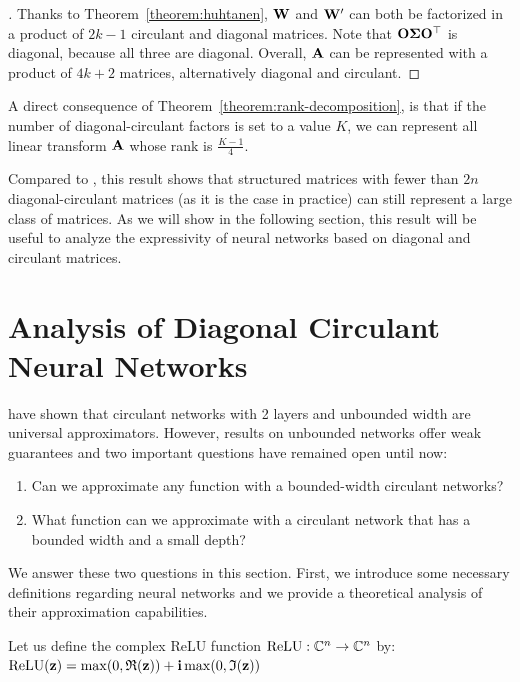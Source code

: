 \begin{proof}[]
Thanks to Theorem~\ref{theorem:huhtanen}, $\mathbf{W}$ and $\mathbf{W}'$ can both be factorized in a product of $2k-1$ circulant and diagonal matrices.
Note that $\mathbf{O} \mathbf{\Sigma} \mathbf{O}^\top$ is diagonal, because all three are diagonal.
Overall, $\mathbf{A}$ can be represented with a product of $4k+2$ matrices, alternatively diagonal and circulant.
\end{proof}


A direct consequence of Theorem~\ref{theorem:rank-decomposition}, is that if the number of diagonal-circulant factors is set to a value $K$, we can represent all linear transform $\mathbf{A}$ whose rank is $\frac{K - 1}{4}$.

Compared to \citet{Huhtanen2015}, this result shows that structured matrices with fewer than $2n$ diagonal-circulant matrices (as it is the case in practice) can still represent a large class of matrices.
As we will show in the following section, this result will be useful to analyze the expressivity of neural networks based on diagonal and circulant matrices.


 \section{Analysis of Diagonal Circulant Neural Networks}
\label{section:analysis_diagonal_circulant}

\citet{pmlr-v70-zhao17b} have shown that circulant networks with 2 layers and unbounded width are universal approximators.
However, results on unbounded networks offer weak guarantees and two important questions have remained open until now: 
\begin{enumerate}
  \item Can we approximate any function with a bounded-width circulant networks?
  \item What function can we approximate with a circulant network that has a bounded width and a small depth?
\end{enumerate}

We answer these two questions in this section.
First, we introduce some necessary definitions regarding neural networks and we provide a theoretical analysis of their approximation capabilities.  


\begin{definition}
Let us define the complex ReLU function $\operatorname{ReLU}: {\mathbb{C}}^n \rightarrow {\ensuremath \mathbb{C}}^n$ by: $\relu(\zvec)= \max\left(0, \mathfrak{R}(\zvec)\right) + \ci \max\left(0, \mathfrak{I}(\zvec) \right)$
\label{definition:relu_function}
\end{definition}

